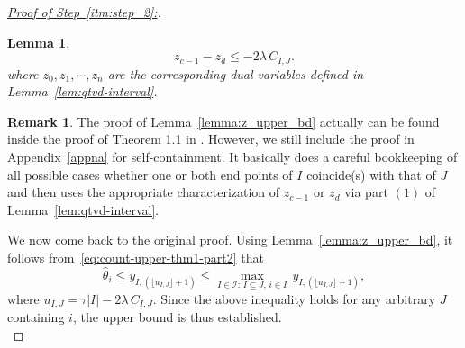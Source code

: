 \documentclass[11pt]{article}
\newcommand{\cI}{\mathcal{I}}
\theoremstyle{plain}
\newtheorem{lemma}[theorem]{Lemma}
\theoremstyle{definition}
\newtheorem{remark}{Remark}
\theoremstyle{remark}
\begin{document}
\begin{proof}[\underline{Proof of Step~\ref{itm:step_2}:}]
\begin{lemma}
\begin{equation}
z_{c-1}-z_d \le -2\lambda\,C_{I,J}.
\end{equation}
where $z_0,z_1,\cdots,z_n$ are the corresponding dual variables defined in Lemma~\ref{lem:qtvd-interval}.
\end{lemma}
\begin{remark}
    The proof of Lemma~\ref{lemma:z_upper_bd} actually can be found inside the proof of Theorem 1.1 in \cite{chatterjee2026minmaxtrendfilteringgeneralizations}. However, we still include the proof in Appendix~\ref{appna} for self-containment. It basically does a careful bookkeeping of all possible cases whether one or both end points of $I$ coincide(s) with that of $J$ and then uses the appropriate characterization of $z_{c-1}$ or $z_d$ via part $(1)$ of Lemma~\ref{lem:qtvd-interval}.
\end{remark}
We now come back to the original proof. Using Lemma~\ref{lemma:z_upper_bd}, it follows from~\eqref{eq:count-upper-thm1-part2} that
\[\hat{\theta}_i\leq y_{I,(\lfloor u_{I,J}\rfloor+1)}\leq \max_{I\in \cI:\,I\subseteq J,\,i\in I}\,y_{I,(\lfloor u_{I,J}\rfloor+1)},\]
where $u_{I,J}=\tau|I|-2\lambda\,C_{I,J}$. Since the above inequality holds for any arbitrary $J$ containing $i$, 
the upper bound is thus established.\\


\end{proof}
\end{document}

